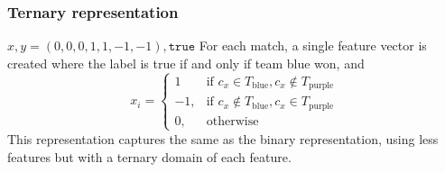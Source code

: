 \subsubsection{Ternary representation}
$x, y = (0,0,0,1,1,-1,-1), \texttt{true}$
For each match, a single feature vector is created where the label is true if and only if team blue won, and
\[
    x_i = 
\begin{cases}
    1 				 & \text{if } c_x \in T_\text{blue}, c_x \not\in T_\text{purple}\\
    -1,              & \text{if } c_x \not\in T_\text{blue}, c_x \in T_\text{purple}\\
    0,              & \text{otherwise}
\end{cases}
\]
This representation captures the same as the binary representation, using less features but with a ternary domain of each feature.


